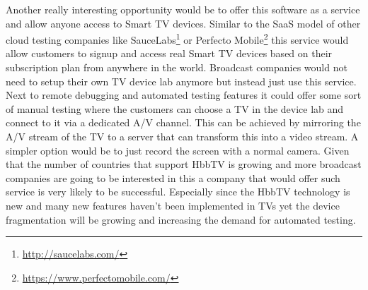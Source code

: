 Another really interesting opportunity would be to offer this software as a service and allow anyone access to Smart TV
devices. Similar to the SaaS model of other cloud testing companies like SauceLabs\footnote{\url{http://saucelabs.com/}}
or Perfecto Mobile\footnote{\url{https://www.perfectomobile.com/}} this service would allow customers to signup and
access real Smart TV devices based on their subscription plan from anywhere in the world. Broadcast companies would
not need to setup their own TV device lab anymore but instead just use this service. Next to remote debugging and
automated testing features it could offer some sort of manual testing where the customers can choose a TV in the device
lab and connect to it via a dedicated A/V channel. This can be achieved by mirroring the A/V stream of the TV to a
server that can transform this into a video stream. A simpler option would be to just record the screen with a normal
camera. Given that the number of countries that support HbbTV is growing and more broadcast companies are going to be
interested in this a company that would offer such service is very likely to be successful. Especially since the
HbbTV technology is new and many new features haven't been implemented in TVs yet the device fragmentation will be
growing and increasing the demand for automated testing.
